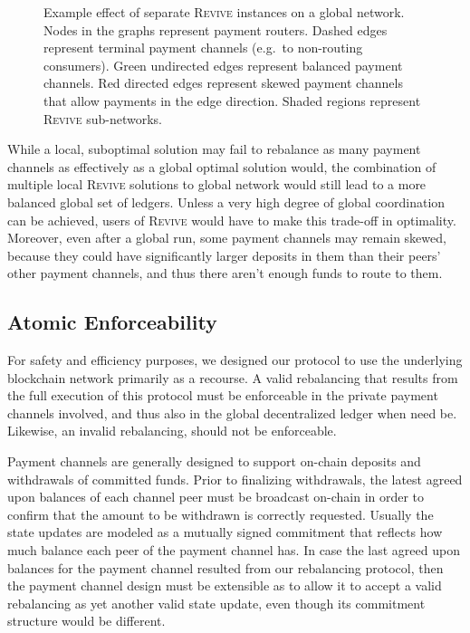 \documentclass[sigconf]{acmart}
\newcommand{\name}{\textsc{Revive}\xspace}
\begin{document}
\begin{figure}[htb!]
\caption{Example effect of separate \name instances on a global network. Nodes in the graphs represent payment routers. Dashed edges represent terminal payment channels (e.g.\ to non-routing consumers). Green undirected edges represent balanced payment channels. Red directed edges represent skewed payment channels that allow payments in the edge direction. Shaded regions represent \name sub-networks.}
\label{globalnetwork}
\end{figure}

While a local, suboptimal solution may fail to rebalance as many payment channels as effectively as a global optimal solution would, the combination of multiple local \name solutions to global network would still lead to a more balanced global set of ledgers. Unless a very high degree of global coordination can be achieved, users of \name would have to make this trade-off in optimality. Moreover, even after a global run, some payment channels may remain skewed, because they could have significantly larger deposits in them than their peers' other payment channels, and thus there aren't enough funds to route to them.


\subsection{Atomic Enforceability}

For safety and efficiency purposes, we designed our protocol to use the underlying blockchain network primarily as a recourse. A valid rebalancing that results from the full execution of this protocol must be enforceable in the private payment channels involved, and thus also in the global decentralized ledger when need be. Likewise, an invalid rebalancing, should not be enforceable.

Payment channels are generally designed to support on-chain deposits and withdrawals of committed funds. Prior to finalizing withdrawals, the latest agreed upon balances of each channel peer must be broadcast on-chain in order to confirm that the amount to be withdrawn is correctly requested. Usually the state updates are modeled as a mutually signed commitment that reflects how much balance each peer of the payment channel has. In case the last agreed upon balances for the payment channel resulted from our rebalancing protocol, then the payment channel design must be extensible as to allow it to accept a valid rebalancing as yet another valid state update, even though its commitment structure would be different.
\end{document}

